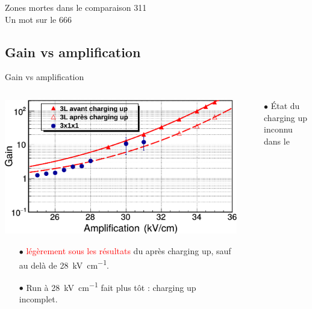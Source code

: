     \begin{frame}{Zones mortes dans le \TOO{}}
        comparaison 311\\
        Un mot sur le 666
    \end{frame}

  \subsection{Gain vs amplification}

    \begin{frame}{Gain vs amplification}
        \begin{scriptsize}
            \begin{columns}
                \begin{column}{0.5\textwidth}
                    \includegraphics[width=\textwidth]{./pictures/gain_vs_ampli.pdf} \\ 
                    \begin{itemize}
                        \item[$\bullet$] \TOO{} \textcolor{red}{légèrement sous les résultats} du \threeL{} après charging up, sauf au delà de \SI{28}{\kilo\volt\per\centi\meter}.
                        \item[$\bullet$] Run à \SI{28}{\kilo\volt\per\centi\meter} fait plus tôt : charging up incomplet.
                    \end{itemize}
                \end{column}
                \begin{column}{0.5\textwidth}
                    \begin{itemize}
                        \item[$\bullet$] État du charging up inconnu dans le \TOO{}

\end{itemize}
\end{column}
\end{columns}
\end{scriptsize}
\end{frame}
